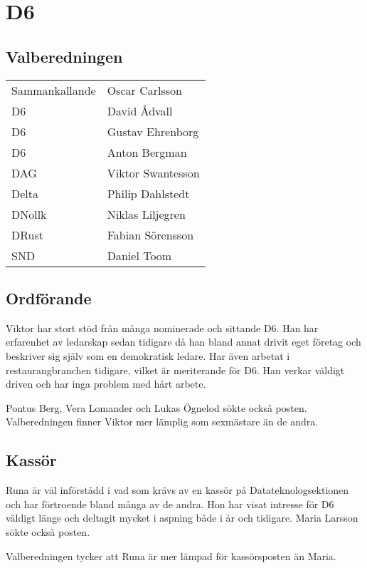 \section{D6}

\subsection{Valberedningen}
\begin{autoframe}

\begin{tabular}{ll}
Sammankallande & Oscar Carlsson \\
D6 & David Ådvall \\
D6 & Gustav Ehrenborg \\
D6 & Anton Bergman \\
DAG  & Viktor Swantesson \\
Delta  & Philip Dahlstedt \\
DNollk & Niklas Liljegren \\
DRust & Fabian Sörensson \\
SND  & Daniel Toom
\end{tabular}

\end{autoframe}



\subsection{Ordförande}
\begin{autoframe}
Viktor har stort stöd från många nominerade och sittande D6. Han har erfarenhet av ledarskap
sedan tidigare då han bland annat drivit eget företag och beskriver sig själv som en demokratisk
ledare. Har även arbetat i restaurangbranchen tidigare, vilket är meriterande för D6.
Han verkar väldigt driven och har inga problem med hårt arbete.

\bigskip
Pontus Berg, Vera Lomander och Lukas Ögnelod sökte också posten. Valberedningen finner
Viktor mer lämplig som sexmästare än de andra.
\end{autoframe}

\subsection{Kassör}
\begin{autoframe}
Runa är väl införstådd i vad som krävs av en kassör på Datateknologsektionen och har
förtroende bland många av de andra. Hon har visat intresse för D6 väldigt länge och deltagit
mycket i aspning både i år och tidigare.
Maria Larsson sökte också posten.

\bigskip
Valberedningen tycker att Runa är mer lämpad för
kassörsposten än Maria.
\end{autoframe}

